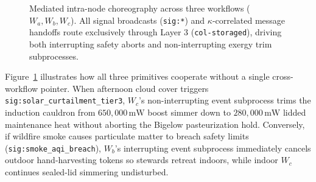 \begin{figure}[htbp]
\caption{Mediated intra-node choreography across three workflows ($W_a, W_b, W_c$). All signal broadcasts (\texttt{sig:*}) and $\kappa$-correlated message handoffs route exclusively through Layer 3 (\texttt{col-storaged}), driving both interrupting safety aborts and non-interrupting exergy trim subprocesses.}
\label{fig:mediated-choreography}
\end{figure}

Figure~\ref{fig:mediated-choreography} illustrates how all three primitives cooperate without a single
cross-workflow pointer. When afternoon cloud cover triggers \texttt{sig:solar\_curtailment\_tier3},
$W_c$'s non-interrupting event subprocess trims the induction cauldron from $650{,}000\,\mathrm{mW}$ boost
simmer down to $280{,}000\,\mathrm{mW}$ lidded maintenance heat without aborting the Bigelow
pasteurization hold. Conversely, if wildfire smoke causes particulate matter to breach safety limits
(\texttt{sig:smoke\_aqi\_breach}), $W_b$'s interrupting event subprocess immediately cancels outdoor
hand-harvesting tokens so stewards retreat indoors, while indoor $W_c$ continues sealed-lid simmering
undisturbed.

